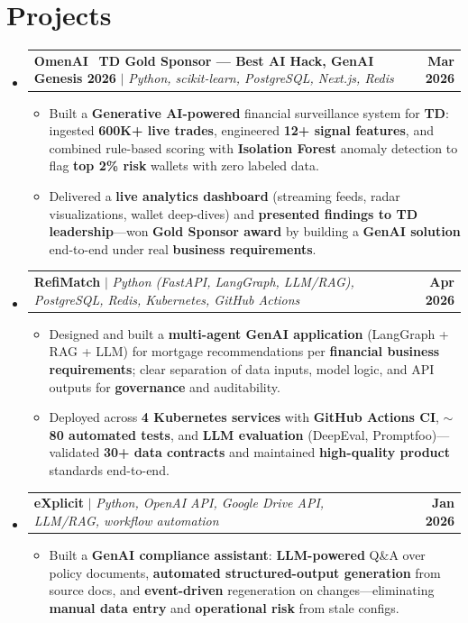 \documentclass[letterpaper,10pt]{article}
\makeatletter
\newcommand{\resumeItem}[1]{
  \item\small{
    {#1 \vspace{-1pt}}
  }
}
\newcommand{\resumeProjectHeading}[2]{
    \item
    \begin{tabular*}{1.001\textwidth}{l@{\extracolsep{\fill}}r}
      \small#1 & \textbf{\small #2}\\
    \end{tabular*}\vspace{-9pt}
}
\newcommand{\resumeSubHeadingListStart}{\begin{itemize}[leftmargin=0.0in, label={}]}
\newcommand{\resumeSubHeadingListEnd}{\end{itemize}}
\newcommand{\resumeItemListStart}{\begin{itemize}[leftmargin=0.15in, topsep=0pt, itemsep=0pt, parsep=0pt, partopsep=0pt]}
\newcommand{\resumeItemListEnd}{\end{itemize}\vspace{-3pt}}
\makeatother
\begin{document}
\section{Projects}
  \resumeSubHeadingListStart
    \resumeProjectHeading
      {\textbf{OmenAI} \textbar\ \textbf{TD Gold Sponsor --- Best AI Hack, GenAI Genesis 2026} $|$ \emph{Python, scikit-learn, PostgreSQL, Next.js, Redis}}{Mar 2026}
    \resumeItemListStart
      \resumeItem{Built a \textbf{Generative AI-powered} financial surveillance system for \textbf{TD}: ingested \textbf{600K+ live trades}, engineered \textbf{12+ signal features}, and combined rule-based scoring with \textbf{Isolation Forest} anomaly detection to flag \textbf{top 2\% risk} wallets with zero labeled data.}
      \resumeItem{Delivered a \textbf{live analytics dashboard} (streaming feeds, radar visualizations, wallet deep-dives) and \textbf{presented findings to TD leadership}---won \textbf{Gold Sponsor award} by building a \textbf{GenAI solution} end-to-end under real \textbf{business requirements}.}
    \resumeItemListEnd
    \vspace{-5pt}
    \resumeProjectHeading
      {\textbf{RefiMatch} $|$ \emph{Python (FastAPI, LangGraph, LLM/RAG), PostgreSQL, Redis, Kubernetes, GitHub Actions}}{Apr 2026}
    \resumeItemListStart
      \resumeItem{Designed and built a \textbf{multi-agent GenAI application} (LangGraph + RAG + LLM) for mortgage recommendations per \textbf{financial business requirements}; clear separation of data inputs, model logic, and API outputs for \textbf{governance} and auditability.}
      \resumeItem{Deployed across \textbf{4 Kubernetes services} with \textbf{GitHub Actions CI}, \textbf{$\sim$80 automated tests}, and \textbf{LLM evaluation} (DeepEval, Promptfoo)---validated \textbf{30+ data contracts} and maintained \textbf{high-quality product} standards end-to-end.}
    \resumeItemListEnd
    \vspace{-5pt}
    \resumeProjectHeading
      {\textbf{eXplicit} $|$ \emph{Python, OpenAI API, Google Drive API, LLM/RAG, workflow automation}}{Jan 2026}
    \resumeItemListStart
      \resumeItem{Built a \textbf{GenAI compliance assistant}: \textbf{LLM-powered} Q\&A over policy documents, \textbf{automated structured-output generation} from source docs, and \textbf{event-driven} regeneration on changes---eliminating \textbf{manual data entry} and \textbf{operational risk} from stale configs.}
    \resumeItemListEnd
  \resumeSubHeadingListEnd
\vspace{-6pt}
\end{document}
